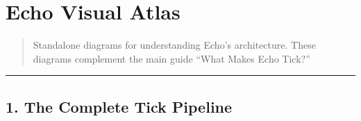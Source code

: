 \documentclass[
]{book}
\author{}
\date{}
\begin{document}
\frontmatter

\mainmatter
\chapter{Echo Visual Atlas}\label{echo-visual-atlas}

\begin{quote}
Standalone diagrams for understanding Echo's architecture. These
diagrams complement the main guide ``What Makes Echo Tick?''
\end{quote}

\begin{center}\rule{0.5\linewidth}{0.5pt}\end{center}

\section{1. The Complete Tick
Pipeline}\label{the-complete-tick-pipeline}
\end{document}
